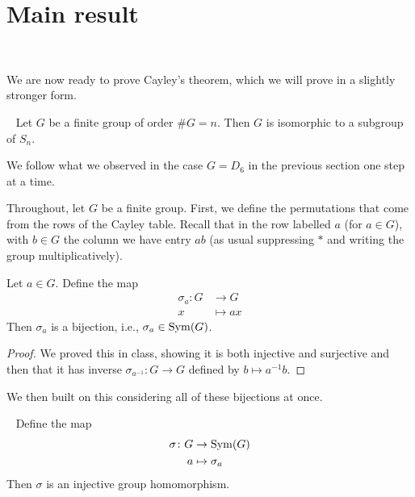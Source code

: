\documentclass[11pt, reqno]{amsart}
\begin{document}
\setlength{\headheight}{13.0pt}
\setlength{\footskip}{15.0pt}


\bigskip









\section{Main result}~\label{sec:thm}

We are now ready to prove Cayley's theorem, which we will prove in a slightly stronger form.

\begin{thm}[Cayley]~\label{thm:Cayleyn}
Let $G$ be a finite group of order $\#G = n$.  Then $G$ is isomorphic to a subgroup of $S_n$.
\end{thm}

We follow what we observed in the case $G=D_6$ in the previous section one step at a time.

Throughout, let $G$ be a finite group.  First, we define the permutations that come from the 
rows of the Cayley table.  Recall that in the row labelled $a$ (for $a \in G$), with $b \in G$ 
the column we have entry $ab$ (as usual suppressing $*$ and writing the group 
multiplicatively).

\begin{lem}
Let $a \in G$.  Define the map
\begin{align*}
\sigma_a \colon G &\to G \\
x &\mapsto ax
\end{align*}
Then $\sigma_a$ is a bijection, i.e., $\sigma_a \in \operatorname{Sym}(G)$.   
\end{lem}

\begin{proof}
We proved this in class, showing it is both injective and surjective and then that it has inverse $\sigma_{a^{-1}} \colon G \to G$ defined by $b \mapsto a^{-1}b$.
\end{proof}

We then built on this considering all of these bijections at once.

\begin{prop}~\label{prop:sigmaG}
Define the map
\begin{align*}
\sigma \colon G &\to \operatorname{Sym}(G) \\
a &\mapsto \sigma_a 
\end{align*}
Then $\sigma$ is an injective group homomorphism.  
\end{prop}
\end{document}
